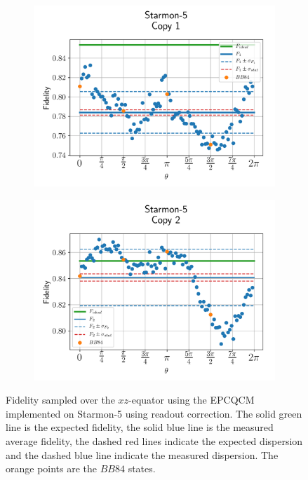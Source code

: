 \begin{figure}[H]
  \centering
  \begin{subfigure}{.5\textwidth}
    \centering
    \includegraphics[width=\textwidth]{Figures/Economical/Starmon/OnlyEquator/results_starmon_copy1.png}
    \label{fig:epc_uncorrected_starmon_equator_1}
  \end{subfigure}%
  \begin{subfigure}{.5\textwidth}
    \centering
    \includegraphics[width=\textwidth]{Figures/Economical/Starmon/OnlyEquator/results_starmon_copy2.png}
    \label{fig:epc_uncorrected_starmon_equator_2}
  \end{subfigure}
  \vspace{-0.5cm}
  \caption{Fidelity sampled over the $xz$-equator using the EPCQCM implemented on Starmon-5 using readout correction.
  The solid green line is the expected fidelity, the solid blue line is the measured average fidelity, the dashed red lines indicate the expected dispersion and the dashed blue line indicate the measured dispersion. The orange points are the $BB84$ states.}
  \label{fig:epc_uncorrected_starmon_equator}
\end{figure}

